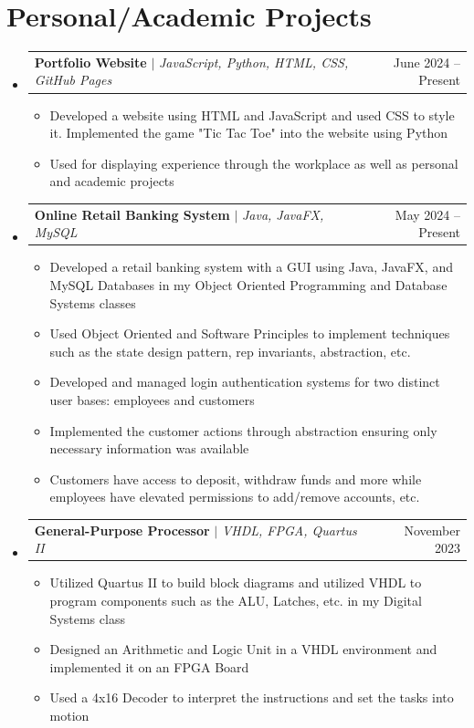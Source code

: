 \documentclass[letterpaper,11pt]{article}
\makeatletter
\newcommand{\resumeItem}[1]{
  \item\small{
    {#1 \vspace{-2pt}}
  }
}
\newcommand{\resumeProjectHeading}[2]{
    \item
    \begin{tabular*}{0.97\textwidth}{l@{\extracolsep{\fill}}r}
      \small#1 & #2 \\
    \end{tabular*}\vspace{-7pt}
}
\newcommand{\resumeSubHeadingListStart}{\begin{itemize}[leftmargin=0.15in, label={}]}
\newcommand{\resumeSubHeadingListEnd}{\end{itemize}}
\newcommand{\resumeItemListStart}{\begin{itemize}}
\newcommand{\resumeItemListEnd}{\end{itemize}\vspace{-5pt}}
\makeatother
\begin{document}
\section{Personal/Academic Projects}
    \resumeSubHeadingListStart
    \resumeProjectHeading
          {\textbf{Portfolio Website} $|$ \emph{JavaScript, Python, HTML, CSS, GitHub Pages}}{June 2024 -- Present}
          \resumeItemListStart
            \resumeItem{Developed a website using HTML and JavaScript and used CSS to style it. Implemented the game "Tic Tac Toe" into the website using Python}
            \resumeItem{Used for displaying experience through the workplace as well as personal and academic projects}
          \resumeItemListEnd
      \resumeProjectHeading
          {\textbf{Online Retail Banking System} $|$ \emph{Java, JavaFX, MySQL}}{May 2024 -- Present}
          \resumeItemListStart
            \resumeItem{Developed a retail banking system with a GUI using Java, JavaFX, and MySQL Databases in my Object Oriented Programming and Database Systems classes}
            \resumeItem{Used Object Oriented and Software Principles to implement techniques such as the state design pattern, rep invariants, abstraction, etc.}
            \resumeItem{Developed and managed login authentication systems for two distinct user bases: employees and customers}
            \resumeItem{Implemented the customer actions through abstraction ensuring only necessary information was available}
            \resumeItem{Customers have access to deposit, withdraw funds and more while employees have elevated permissions to add/remove accounts, etc.}
          \resumeItemListEnd
      \resumeProjectHeading
          {\textbf{General-Purpose Processor} $|$ \emph{VHDL, FPGA, Quartus II}}{November 2023}
          \resumeItemListStart
            \resumeItem{Utilized Quartus II to build block diagrams and utilized VHDL to program components such as the ALU, Latches, etc. in my Digital Systems class}
            \resumeItem{Designed an Arithmetic and Logic Unit in a VHDL environment and implemented it on an FPGA Board}
            \resumeItem{Used a 4x16 Decoder to interpret the instructions and set the tasks into motion}
          \resumeItemListEnd
    \resumeSubHeadingListEnd

%

\end{document}
